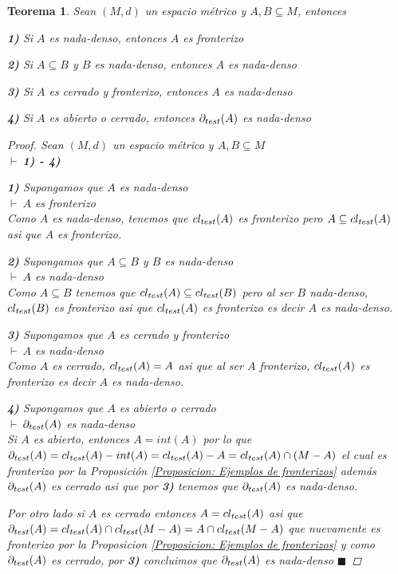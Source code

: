 \documentclass[oneside]{book} %
\theoremstyle{Teorema}
\newtheorem{Teorema}[Definicion]{Teorema}
\theoremstyle{Ejemplos}
\theoremstyle{[Obs]}
\def \test {test}
\newcommand{\cerradura}[2][\test]{\ifx \test #1 {\overline{#2}} \else {cl_{#1}(#2)} \fi} %
\newcommand{\frontera}[2][\test]{\ifx \test #1 {\partial(#2)} \else {\partial_{#1}(#2)} \fi} %
\renewcommand{\{}{\left\lbrace} %
\renewcommand{\}}{\right\rbrace} %
\newcommand{\n}{\cap} %
\renewcommand{\sc}{\subseteq} %
\renewcommand{\qed}{$\blacksquare$} %
\newcommand{\pd}{$\vdash\ $} %
\begin{document}
			\begin{Teorema}\setlength{\parindent}{0em}
				
				Sean $(M, d)$ un espacio métrico y $A, B \sc M$, entonces 

				\textbf{1)} Si $A$ es nada-denso, entonces $A$ es fronterizo 

				\textbf{2)} Si $A \sc B$ y $B$ es nada-denso, entonces $A$ es nada-denso 

				\textbf{3)} Si $A$ es cerrado y fronterizo, entonces $A$ es nada-denso 

				\textbf{4)} Si $A$ es abierto o cerrado, entonces $\frontera{A}$ es nada-denso

				\begin{proof}
					
					Sean $(M, d)$ un espacio métrico y $A, B \sc M$ \\ 
					\pd \textbf{1) - 4)} 

					\textbf{1)} Supongamos que $A$ es nada-denso \\ 
					\pd $A$ es fronterizo \\ 
					Como $A$ es nada-denso, tenemos que $\cerradura{A}$ es fronterizo pero $A \sc \cerradura{A}$ asi que $A$ es fronterizo. 

					\textbf{2)} Supongamos que $A \sc B$ y $B$ es nada-denso \\ 
					\pd $A$ es nada-denso \\ 
					Como $A \sc B$ tenemos que $\cerradura{A} \sc \cerradura{B}$ pero al ser $B$ nada-denso, $\cerradura{B}$ es fronterizo asi que $\cerradura{A}$ es fronterizo es decir $A$ es nada-denso.

					\textbf{3)} Supongamos que $A$ es cerrado y fronterizo \\ 
					\pd $A$ es nada-denso \\ 
					Como $A$ es cerrado, $\cerradura{A} = A$ asi que al ser $A$ fronterizo, $\cerradura{A}$ es fronterizo es decir $A$ es nada-denso.

					\textbf{4)} Supongamos que $A$ es abierto o cerrado \\ 
					\pd $\frontera{A}$ es nada-denso \\ 
					Si $A$ es abierto, entonces $A = int(A)$ por lo que $\frontera{A} = \cerradura{A} - int(A) = \cerradura{A} - A = \cerradura{A} \n (M - A)$ el cual es fronterizo por la Proposición \ref{Proposicion: Ejemplos de fronterizos} además $\frontera{A}$ es cerrado asi que por \textbf{3)} tenemos que $\frontera{A}$ es nada-denso. 

					Por otro lado si $A$ es cerrado entonces $A = \cerradura{A}$ asi que $\frontera{A} = \cerradura{A} \n \cerradura{M - A} = A \n \cerradura{M - A}$ que nuevamente es fronterizo por la Proposicion \ref{Proposicion: Ejemplos de fronterizos} y como $\frontera{A}$ es cerrado, por \textbf{3)} concluimos que $\frontera{A}$ es nada-denso \qed

				\end{proof}

			\end{Teorema}
\end{document}

